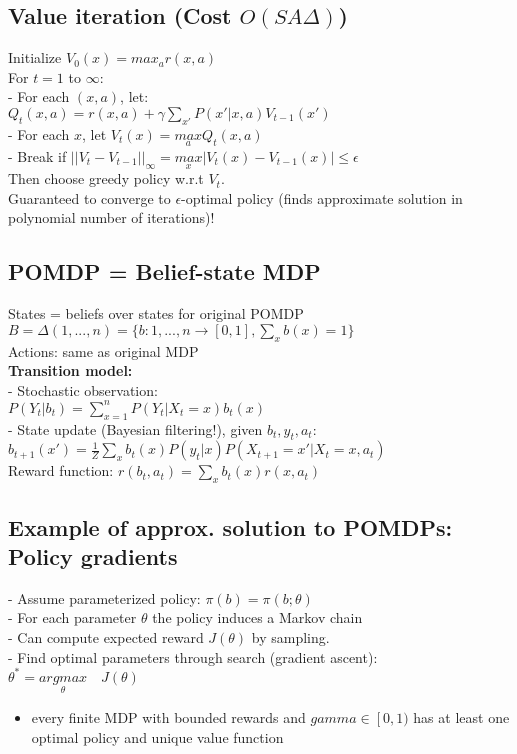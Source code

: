 \subsection{Value iteration (Cost $O(SA\Delta)$)}
Initialize $V_0(x)=max_a r(x,a)$\\
For $t=1$ to $\infty$:\\
- For each $(x,a)$, let: \\
$Q_t(x,a)=r(x,a)+\gamma\sum_{x'}P(x'|x,a)V_{t-1}(x')$\\
- For each $x$, let $V_t(x)=\underset{a}{max}Q_t(x,a)$\\
- Break if $||V_t-V_{t-1}||_{\infty}=\underset{x}{max}|V_t(x)-V_{t-1}(x)|\leq\epsilon$\\
Then choose greedy policy w.r.t $V_t$.\\
Guaranteed to converge to $\epsilon$-optimal policy (finds approximate solution in polynomial number of iterations)!




\subsection{POMDP = Belief-state MDP}
States = beliefs over states for original POMDP\\
$B=\Delta({1,...,n})=\{ b:{1,...,n} \rightarrow [0,1],\sum_x b(x)=1 \}$\\
Actions: same as original MDP\\
\textbf{Transition model:}\\
- Stochastic observation:\\
$P(Y_t|b_t)=\sum_{x=1}^n P(Y_t|X_t=x)b_t(x)$\\
- State update (Bayesian filtering!), given $b_t, y_t, a_t$:
$b_{t+1}(x')=\frac{1}{Z}\sum_xb_t(x)P(y_t|x)P(X_{t+1}=x'|X_t=x,a_t)$\\
Reward function: $r(b_t, a_t)=\sum_x b_t(x)r(x,a_t)$

\subsection{Example of approx. solution to POMDPs: Policy gradients}
- Assume parameterized policy: $\pi(b)=\pi(b;\theta)$\\
- For each parameter $\theta$ the policy induces a Markov chain\\
- Can compute expected reward $J(\theta)$ by sampling.\\
- Find optimal parameters through search (gradient ascent):
$\theta^* = \underset{\theta}{arg max}\quad J(\theta)$


\begin{itemize}
    \item every finite MDP with bounded rewards and $gamma \in \left[ 0,1)$ has at least one optimal policy and
    unique value function
\end{itemize}